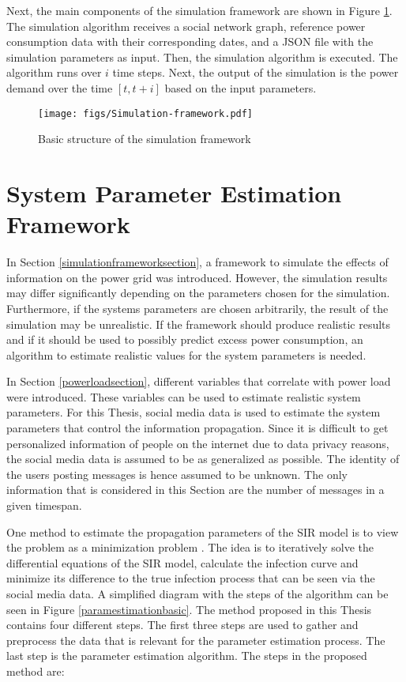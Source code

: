 Next, the main components of the simulation framework are shown
in Figure \ref{simframework}.
The simulation algorithm receives a social 
network graph, reference power consumption data with their 
corresponding dates, and 
a JSON file with the simulation parameters as input. 
Then, the simulation algorithm is executed.
The algorithm runs over
$i$ time steps. Next, the output of the simulation is the 
power demand over the time $[t, t+i]$ based on the
input parameters.

\begin{figure}[!ht]
    \center
    \texttt{[image: figs/Simulation-framework.pdf]}
    \caption{Basic structure of the simulation framework}
    \label{simframework}
\end{figure}


\section{System Parameter Estimation Framework}
\label{parameterestimationalgo}

In Section \ref{simulationframeworksection}, a framework to simulate the effects 
of information on the power grid was introduced. However, the simulation results
may differ significantly depending on the parameters chosen for the simulation.
Furthermore, if the systems parameters are chosen arbitrarily,
the result of the simulation may be unrealistic. 
If the framework should produce realistic results and if
it should be used to possibly predict excess power consumption, an 
algorithm to estimate realistic values for the system parameters is needed.

In Section \ref{powerloadsection}, different variables that 
correlate with power load were introduced. These variables can be 
used to estimate realistic system parameters. For this Thesis, social media data is 
used to estimate the system parameters that control the 
information propagation. Since it is difficult to get personalized 
information of people on the internet due to data privacy reasons, the
social media data is assumed to be as generalized as possible. 
The identity of the users posting messages is hence assumed to be unknown. 
The only information
that is considered in this Section are the number of messages 
in a given timespan.

One method to estimate the propagation parameters of the SIR model 
is to view the problem as a minimization problem 
\cite{jin2013epidemiological}. The idea is to iteratively solve the differential 
equations of the SIR model, calculate the infection curve and minimize 
its difference to the true infection process that can be seen via the
social media data. A simplified diagram with the steps of the algorithm
can be seen in Figure \ref{paramestimationbasic}. The method proposed 
in this Thesis contains four different steps. 
The first three steps are used to gather and preprocess 
the data that is relevant for the parameter estimation process.
The last step is the parameter estimation algorithm.
The steps in the proposed method are:

